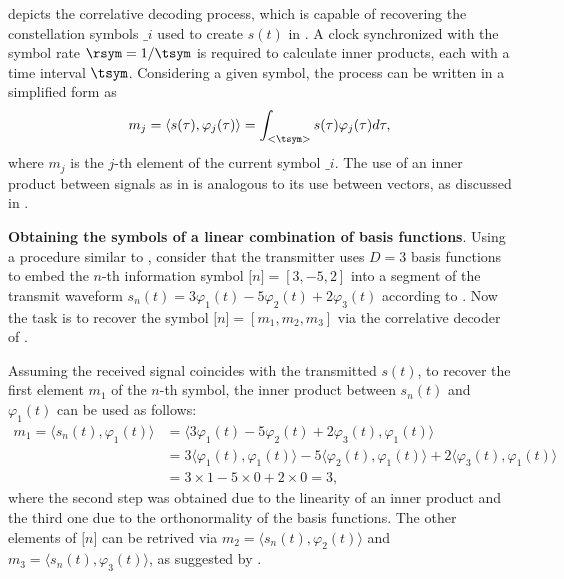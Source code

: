  depicts the correlative decoding process, which is capable of recovering the constellation symbols $\bm_i$ used to create $s(t)$ in . 
A clock synchronized with the symbol rate $\rsym=1/\tsym$ is required to calculate inner products, each with a time interval $\tsym$. Considering a given symbol, the process can be written in a simplified form as
\begin{equation}
m_j = \left< s(\tau), \varphi_j(\tau) \right> = \int_{<\tsym>} s(\tau) \varphi_j(\tau) d\tau,
\label{eq:correlativeDecoder}
\end{equation}
where $m_j$ is the $j$-th element of the current symbol $\bm_i$.
The use of an inner product between signals as in  is analogous to
its use between vectors, as discussed in .

\bExample \textbf{Obtaining the symbols of a linear combination of basis functions}.
Using a procedure similar to , consider that
the transmitter uses $D=3$ basis functions to embed the $n$-th information symbol 
$\bm[n] = [3,-5,2]$ into a
segment of the transmit waveform $s_n(t)=3 \varphi_1(t) - 5\varphi_2(t) + 2\varphi_3(t)$ according to . Now the task is to recover the symbol $\bm[n] = [m_1,m_2,m_3]$ via 
the correlative decoder of .

Assuming the received signal coincides with the transmitted $s(t)$, to recover the
first element $m_1$ of the $n$-th symbol, the inner product between $s_n(t)$ and $\varphi_1(t)$
can be used as follows:
\begin{align*}
m_1 = \langle s_n(t), \varphi_1(t) \rangle &= 
\langle 3 \varphi_1(t) - 5\varphi_2(t) + 2\varphi_3(t), \varphi_1(t) \rangle \\
 &= 3 \langle \varphi_1(t), \varphi_1(t) \rangle - 5\langle \varphi_2(t), \varphi_1(t) \rangle + 2\langle \varphi_3(t), \varphi_1(t) \rangle \\
 &= 3 \times 1 - 5 \times 0 + 2 \times 0 = 3,
\end{align*}
where the second step was obtained due to the linearity of an inner product and the third one
due to the orthonormality of the basis functions. The other elements of $\bm[n]$ can be 
retrived via $m_2 = \langle s_n(t), \varphi_2(t) \rangle$ and $m_3 = \langle s_n(t), \varphi_3(t) \rangle$, as suggested by .
\eExample

